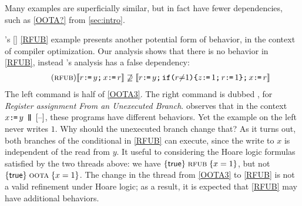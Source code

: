 
Many examples are superficially similar, but in fact have fewer dependencies,
such as \eqref{OOTA?} from \textsection\ref{sec:intro}.

\citeauthor{BoehmOOTA}'s [\citeyear{BoehmOOTA}] \ref{RFUB} example presents
another potential form of \oota{} behavior, in the context of compiler
optimization.  Our analysis shows that there is no \oota{} behavior in
\ref{RFUB}, instead \citeauthor{BoehmOOTA}'s analysis has a false dependency:
\begin{gather*}
  \tag{\textsc{rfub}}\label{RFUB}
  \sem{r\GETS y\SEMI x\GETS r}
  \not\supseteq
  \sem{r\GETS y\SEMI \IF{r \NOTEQ 1} \THEN z\GETS 1\SEMI r\GETS 1\FI \SEMI x\GETS r}
\end{gather*}
The left command is half of \ref{OOTA3}. %
The right command is dubbed \rfub{}, for \emph{Register assignment From an
  Unexecuted Branch}.  \citeauthor{BoehmOOTA} observes that in the context
$x\GETS y \PAR \hole{}$, these programs have different behaviors.  Yet the
\oota{} example on the left never writes $1$.  Why should the unexecuted
branch change that?  As it turns out, both branches of the conditional in
\ref{RFUB} can execute, since the write to $x$ is independent of the read
from $y$.  It useful to considering the Hoare logic formulas satisfied by the
two threads above: we have $\{\mathsf{true}\}\allowbreak\;\text{{\sc rfub}}\;\allowbreak\{x=1\}$, but not
$\{\mathsf{true}\}\allowbreak\;\text{{\sc oota}}\;\allowbreak\{x=1\}$.  The change in the thread from
\ref{OOTA3} to \ref{RFUB} is not a valid refinement under Hoare logic; as a
result, it is expected that \ref{RFUB} may have additional behaviors.

